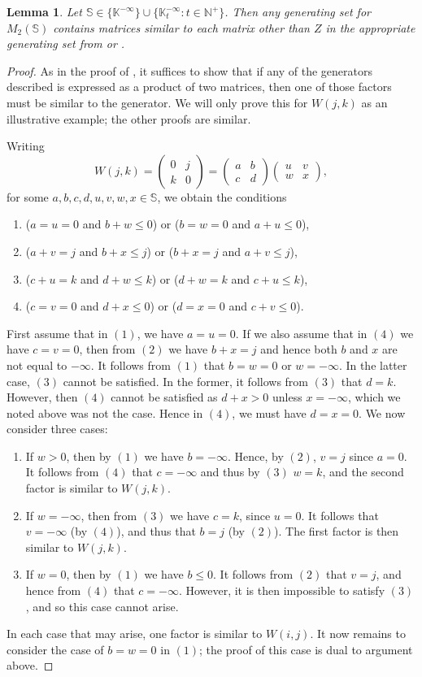 \documentclass[11pt]{article}
\newtheorem{lemma}[thm]{Lemma}
\numberwithin{equation}{section}
\newcommand{\set}[2]{\ensuremath{\{#1 : #2 \}}}
\renewcommand{\S}{\mathbb{S}}
\newcommand{\N}{\mathbb{N}}
\newcommand{\Np}{\N^{+}}
\newcommand{\K}{\mathbb{K}}
\newcommand{\Kmax}{\K^{-\infty}}
\newcommand{\Kmaxt}{\K^{-\infty}_t}
\newcommand{\mat}[4]{\begin{pmatrix}#1&#2\\#3&#4\end{pmatrix}}
\begin{document}
\begin{lemma}
  Let $\S \in \{\Kmax\} \cup \set{\Kmaxt}{t \in \Np}$. Then any generating
  set for $M_{2}(\S)$ contains matrices similar to each matrix other than $Z$
  in the appropriate generating set from  or .
\end{lemma}
\begin{proof}
  As in the proof of , it suffices to show
  that if any of the generators described is expressed as a product of two
  matrices, then one of those factors must be similar to the generator. We will
  only prove this for $W(j, k)$ as an illustrative example; the other proofs are
  similar.

  Writing 
  \[W(j, k) = \mat{0}{j}{k}{0} = \mat{a}{b}{c}{d} \mat{u}{v}{w}{x},\]
  for some $a,b,c,d,u,v,w,x \in \S$, we obtain the conditions
  \begin{enumerate}
    \item
      ($a = u = 0$ and $b + w \leq 0$) or ($b = w = 0$ and $a + u \leq 0$),
    \item
      ($a + v = j$ and $b + x \leq j$) or ($b + x = j$ and $a + v \leq j$),
    \item
      ($c + u = k$ and $d + w \leq k$) or ($d + w = k$ and $c + u \leq k$),
    \item
      ($c = v = 0$ and $d + x \leq 0$) or ($d = x = 0$ and $c + v \leq 0$).
  \end{enumerate}
  First assume that in $(1)$, we have $a = u = 0$. If we also assume that in
  $(4)$ we have $c = v = 0$, then from $(2)$ we have $b + x = j$ and hence both
  $b$ and $x$ are not equal to $-\infty$. It follows from $(1)$ that $b = w = 0$
  or $w = -\infty$. In the latter case, $(3)$ cannot be satisfied. In the
  former, it follows from $(3)$ that $d = k$. However, then $(4)$ cannot be
  satisfied as $d + x > 0$ unless $x = -\infty$, which we noted above was not
  the case. Hence in $(4)$, we must have $d = x = 0$. We now consider three
  cases:
  \begin{enumerate}
    \item
      If $w > 0$, then by $(1)$ we have $b = -\infty$. Hence, by $(2)$, $v = j$
      since $a = 0$. It follows from $(4)$ that $c = -\infty$ and thus by $(3)$
      $w = k$, and the second factor is similar to $W(j, k)$.
    \item
      If $w = -\infty$, then from $(3)$ we have $c = k$, since $u = 0$. It
      follows that $v = -\infty$ (by $(4)$), and thus that $b = j$ (by $(2)$).
      The first factor is then similar to $W(j, k)$.
    \item
      If $w = 0$, then by $(1)$ we have $b \leq 0$. It follows from $(2)$ that
      $v = j$, and hence from $(4)$ that $c = -\infty$. However, it is then
      impossible to satisfy $(3)$, and so this case cannot arise.
  \end{enumerate}
  In each case that may arise, one factor is similar to $W(i, j)$. It now
  remains to consider the case of $b = w = 0$ in $(1)$; the proof of this case
  is dual to argument above.
\end{proof}
\end{document}
